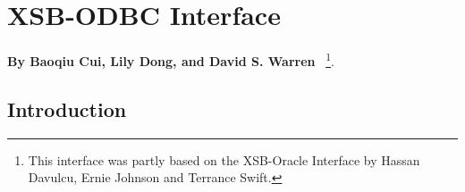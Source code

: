 \chapter{XSB-ODBC Interface} \label{odbc_interface}

\begin{center}
{\Large {\bf By Baoqiu Cui, Lily Dong, and David S. Warren
}}~\footnote{This interface was partly based on the XSB-Oracle
Interface by Hassan Davulcu, Ernie Johnson and Terrance Swift.}.
\end{center}

\section{Introduction}

